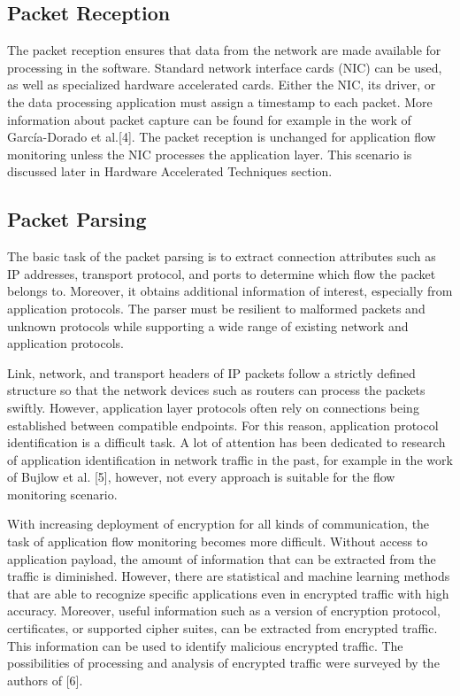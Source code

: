 \subsection{Packet Reception}

The packet reception ensures that data from the network are made available for processing in the software. Standard network interface cards (NIC) can be used, as well as specialized hardware accelerated cards. Either the NIC, its driver, or the data processing application must assign a timestamp to each packet. More information about packet capture can be found for example in the work of García-Dorado et al.[4]. The packet reception is unchanged for application flow monitoring unless the NIC processes the application layer. This scenario is discussed later in Hardware Accelerated Techniques section.


\subsection{Packet Parsing}

The basic task of the packet parsing is to extract connection attributes such as IP addresses, transport protocol, and ports to determine which flow the packet belongs to. Moreover, it obtains additional information of interest, especially from application protocols. The parser must be resilient to malformed packets and unknown protocols while supporting a wide range of existing network and application protocols.

Link, network, and transport headers of IP packets follow a strictly defined structure so that the network devices such as routers can process the packets swiftly. However, application layer protocols often rely on connections being established between compatible endpoints. For this reason, application protocol identification is a difficult task. A lot of attention has been dedicated to research of application identification in network traffic in the past, for example in the work of Bujlow et al. [5], however, not every approach is suitable for the flow monitoring scenario.

With increasing deployment of encryption for all kinds of communication, the task of application flow monitoring becomes more difficult. Without access to application payload, the amount of information that can be extracted from the traffic is diminished. However, there are statistical and machine learning methods that are able to recognize specific applications even in encrypted traffic with high accuracy. Moreover, useful information such as a version of encryption protocol, certificates, or supported cipher suites, can be extracted from encrypted traffic. This information can be used to identify malicious encrypted traffic. The possibilities of processing and analysis of encrypted traffic were surveyed by the authors of [6].

